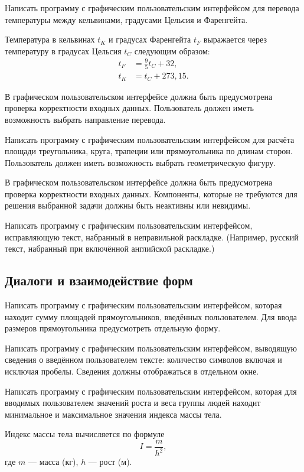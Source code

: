 \task Написать программу с графическим пользовательским интерфейсом
для перевода температуры между кельвинами, градусами Цельсия и
Фаренгейта.

Температура в кельвинах $t_K$ и градусах Фаренгейта $t_F$ выражается
через температуру в градусах Цельсия $t_C$ следующим образом:
\begin{align*}
  t_F &= \frac95 t_C + 32,\\
  t_K &= t_C + 273{,}15.
\end{align*}

В графическом пользовательском интерфейсе должна быть предусмотрена
проверка корректности входных данных. Пользователь должен иметь
возможность выбрать направление перевода.

\task Написать программу с графическим пользовательским интерфейсом
для расчёта площади треугольника, круга, трапеции или прямоугольника
по длинам сторон. Пользователь должен иметь возможность выбрать
геометрическую фигуру.

В графическом пользовательском интерфейсе должна быть предусмотрена
проверка корректности входных данных. Компоненты, которые не требуются
для решения выбранной задачи должны быть неактивны или невидимы.

\task Написать программу с графическим пользовательским интерфейсом,
исправляющую текст, набранный в неправильной раскладке. (Например,
русский текст, набранный при включённой английской раскладке.)


\subsection{Диалоги и взаимодействие форм}

\task Написать программу с графическим пользовательским интерфейсом,
которая находит сумму площадей прямоугольников, введённых
пользователем. Для ввода размеров прямоугольника предусмотреть
отдельную форму.

\task Написать программу с графическим пользовательским интерфейсом,
выводящую сведения о введённом пользователем тексте: количество
символов включая и исключая пробелы. Сведения должны отображаться в
отдельном окне.

\task Написать программу с графическим пользовательским интерфейсом,
которая для вводимых пользователем значений роста и веса группы людей
находит минимальное и максимальное значения индекса массы тела.

Индекс массы тела вычисляется по формуле
\[
I=\frac{m}{h^2},
\]
где $m$ — масса (кг), $h$ — рост (м).

